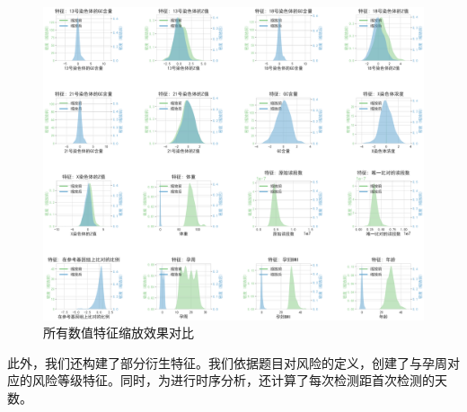 \begin{figure}[h!]
\centering
\includegraphics[width=1\textwidth]{figs/2模型准备/图6_特征缩放效果对比.png}
\caption{所有数值特征缩放效果对比}
\label{fig:数值特征缩放效果对比}
\end{figure}


此外，我们还构建了部分衍生特征。我们依据题目对风险的定义，创建了与孕周对应的风险等级特征。同时，为进行时序分析，还计算了每次检测距首次检测的天数。